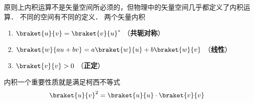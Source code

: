 

原则上内积运算不是矢量空间所必须的，但物理中的矢量空间几乎都定义了内积运算． 不同的空间有不同的定义． 两个矢量内积

\begin{enumerate}
\item $\braket{u}{v} = \braket{v}{u}^*$ （\textbf{共轭对称}）
\item $\braket{w}{a u + b v} = a\braket{w}{u} + b\braket{w}{v}$ （\textbf{线性}）
\item $\braket{v}{v} > 0$ （\textbf{正定}）
\end{enumerate}

内积一个重要性质就是满足柯西不等式
\begin{equation}
\braket{u}{v}^2 = \braket{u}{u} \cdot \braket{v}{v}
\end{equation}
